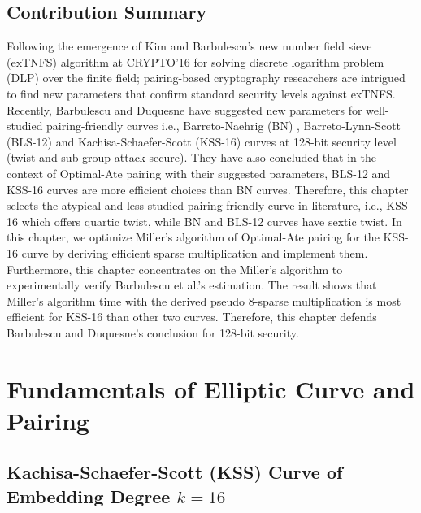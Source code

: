 \subsection{Contribution Summary}
Following the emergence of Kim and Barbulescu's new number field sieve (exTNFS) algorithm at CRYPTO'16 \cite{C:KimBar16} for solving discrete logarithm problem (DLP) over the finite field; pairing-based cryptography researchers are intrigued to find new parameters that confirm standard security levels against exTNFS. 
Recently, Barbulescu and Duquesne have suggested new parameters \cite{EPRINT:BarDuq17} for well-studied pairing-friendly curves i.e., Barreto-Naehrig (BN) \cite{SAC:BarNae05}, Barreto-Lynn-Scott (BLS-12) \cite{SCN:BarLynSco02} and Kachisa-Schaefer-Scott (KSS-16) \cite{EPRINT:KacSchSco07} curves at 128-bit security level (twist and sub-group attack secure). 
They have also concluded that in the context of Optimal-Ate pairing with their suggested parameters, BLS-12 and KSS-16 curves are more efficient choices than BN curves. 
Therefore, this chapter selects the atypical and less studied pairing-friendly curve in literature, i.e., KSS-16 which offers quartic twist, while BN and BLS-12 curves have sextic twist.
In this chapter, we optimize Miller's algorithm of Optimal-Ate pairing for the KSS-16 curve by deriving efficient sparse multiplication and implement them.
Furthermore, this chapter concentrates on the Miller's algorithm to experimentally verify Barbulescu et al.'s estimation.
The result shows that Miller's algorithm time with the derived pseudo 8-sparse multiplication is most efficient for KSS-16 than other two curves.
Therefore, this chapter defends Barbulescu and Duquesne's conclusion for 128-bit security.


\section{Fundamentals of Elliptic Curve and Pairing}

\subsection{Kachisa-Schaefer-Scott (KSS) Curve of Embedding Degree \texorpdfstring{$k=16$}{k=16}}
\label{sec:ch:indo:kss16curve}

